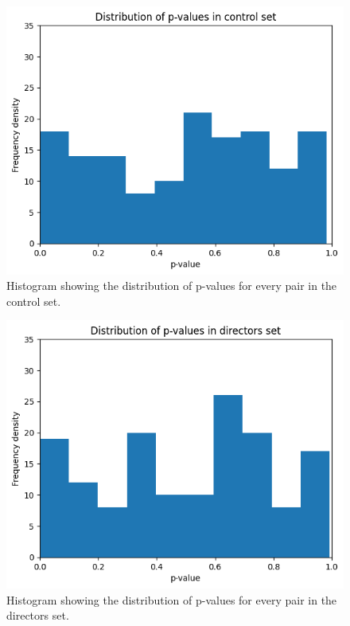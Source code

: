 \documentclass{UoYCSproject}
\begin{document}
\begin{figure}[h!]
\begin{center}
\includegraphics[scale=0.7]{"./images/control_histogram"}
\end{center}
\caption{Histogram showing the distribution of p-values for every pair in the control set.}
\end{figure}
\newpage

\begin{figure}[h!]
\begin{center}
\includegraphics[scale=0.7]{"./images/directors_histogram"}
\end{center}
\caption{Histogram showing the distribution of p-values for every pair in the directors set.}
\end{figure}
\end{document}
